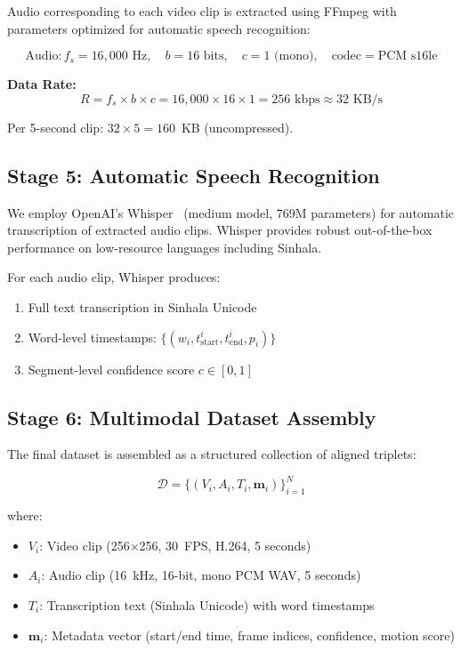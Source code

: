 \documentclass[journal]{IEEEtran}
\begin{document}
Audio corresponding to each video clip is extracted using FFmpeg with parameters optimized for automatic speech recognition:

\begin{equation}
\text{Audio}: f_s = 16{,}000 \text{ Hz}, \quad b = 16 \text{ bits}, \quad c = 1 \text{ (mono)}, \quad \text{codec} = \text{PCM s16le}
\end{equation}

\textbf{Data Rate:}
\begin{equation}
R = f_s \times b \times c = 16{,}000 \times 16 \times 1 = 256 \text{ kbps} \approx 32 \text{ KB/s}
\end{equation}

Per 5-second clip: $32 \times 5 = 160$~KB (uncompressed).

\subsection{Stage 5: Automatic Speech Recognition}

We employ OpenAI's Whisper~\cite{radford2023robust} (medium model, 769M parameters) for automatic transcription of extracted audio clips. Whisper provides robust out-of-the-box performance on low-resource languages including Sinhala.

For each audio clip, Whisper produces:
\begin{enumerate}
    \item Full text transcription in Sinhala Unicode
    \item Word-level timestamps: $\{(w_i, t_{\text{start}}^i, t_{\text{end}}^i, p_i)\}$
    \item Segment-level confidence score $c \in [0, 1]$
\end{enumerate}

\subsection{Stage 6: Multimodal Dataset Assembly}

The final dataset is assembled as a structured collection of aligned triplets:

\begin{equation}
\mathcal{D} = \{(V_i, A_i, T_i, \mathbf{m}_i)\}_{i=1}^{N}
\end{equation}

where:
\begin{itemize}
    \item $V_i$: Video clip (256$\times$256, 30~FPS, H.264, 5 seconds)
    \item $A_i$: Audio clip (16~kHz, 16-bit, mono PCM WAV, 5 seconds)
    \item $T_i$: Transcription text (Sinhala Unicode) with word timestamps
    \item $\mathbf{m}_i$: Metadata vector (start/end time, frame indices, confidence, motion score)
\end{itemize}
\end{document}
